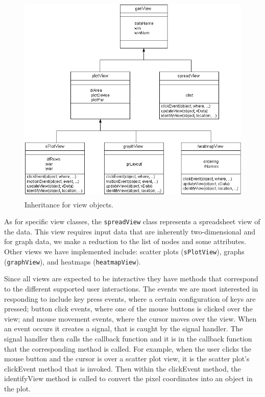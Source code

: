 \documentclass[11pt]{article}
\newcommand{\Rfunction}[1]{{\textsf{#1}}}
\newcommand{\Rclass}[1]{\texttt{#1}}
\begin{document}
\begin{figure}[ht]
  \begin{center}
    \includegraphics[height=4in, width=5in]{newViewClass.jpg}
    \caption{ Inheritance for view objects. }
    \label{Fig:View}
  \end{center}
\end{figure}

As for specific view classes, the \Rclass{spreadView} class represents
a spreadsheet view of the data.  This view requires input data that are
inherently two-dimensional and for graph data, we make a reduction to the 
list of nodes and some attributes.  Other views we have implemented 
include: scatter plots
(\Rclass{sPlotView}), graphs (\Rclass{graphView}), and heatmaps
(\Rclass{heatmapView}).

Since all views are expected to be interactive they have methods that
correspond to the different supported user interactions.  The events
we are most interested in responding to include key press events,
where a certain configuration of keys are pressed; button click
events, where one of the mouse buttons is clicked over the view; and
mouse movement events, where the cursor moves over the view.  When an
event occurs it creates a signal, that is caught by the signal
handler.  The signal handler then calls the callback function and it
is in the callback function that the corresponding method is called.
For example, when the user clicks the mouse button and the cursor is
over a scatter plot view, it is the scatter plot's
\Rfunction{clickEvent} method that is invoked.  Then within the
\Rfunction{clickEvent} method, the \Rfunction{identifyView} method is called
to convert the pixel coordinates into an object in the plot.
\end{document}
